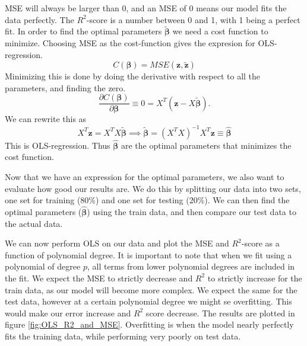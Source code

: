 \documentclass[reprint,english,notitlepage,aps,nobalancelastpage,nofootinbib]{revtex4-1}  %
\newcommand{\vc}[1]{\mathbf{#1}}
\begin{document}
MSE will always be larger than 0, and an MSE of 0 means our model fits the data perfectly. The $R^2$-score is a number between 0 and 1, with 1 being a perfect fit. In order to find the optimal parameters $\boldsymbol{\tilde{\beta}}$ we need a cost function to minimize. Choosing MSE as the cost-function gives the expresion for OLS-regression.
\begin{equation*}
	C(\boldsymbol{\beta}) = MSE(\boldsymbol{z}, \boldsymbol{\tilde{z}})
\end{equation*}
Minimizing this is done by doing the derivative with respect to all the parameters, and finding the zero.
\begin{equation}\label{eq:Const_OLS}
	\frac{\partial C(\boldsymbol{\beta})}{\partial \boldsymbol{\beta}} \equiv 0 = X^T(\boldsymbol{z} - X\boldsymbol{\tilde{\beta}}).
\end{equation}
We can rewrite this as
\begin{equation}\label{eq:OLS_beta}
	X^T\vc{z} = X^TX\boldsymbol{\tilde{\beta}} \implies \boldsymbol{\tilde{\beta}} = (X^TX)^{-1} X^T \vc{z} \equiv \boldsymbol{\hat{\beta}}
\end{equation}
This is OLS-regression. Thus $\boldsymbol{\hat{\beta}}$ are the optimal parameters that minimizes the cost function.

Now that we have an expression for the optimal parameters, we also want to evaluate how good our results are. We do this by splitting our data into two sets, one set for training (80\%) and one set for testing (20\%). We can then find the optimal parameters ($\boldsymbol{\hat{\beta}}$) using the train data, and then compare our test data to the actual data.


We can now perform OLS on our data and plot the MSE and $R^2$-score as a function of polynomial degree. It is important to note that when we fit using a polynomial of degree $p$, all terms from lower polynomial degrees are included in the fit. We expect the MSE to strictly decrease and $R^2$ to strictly increase for the train data, as our model will become more complex. We expect the same for the test data, however at a certain polynomial degree we might se overfitting. This would make our error increase and $R^2$ score decrease. The results are plotted in figure \ref{fig:OLS_R2_and_MSE}. Overfitting is when the model nearly perfectly fits the training data, while performing very poorly on test data.
\end{document}
